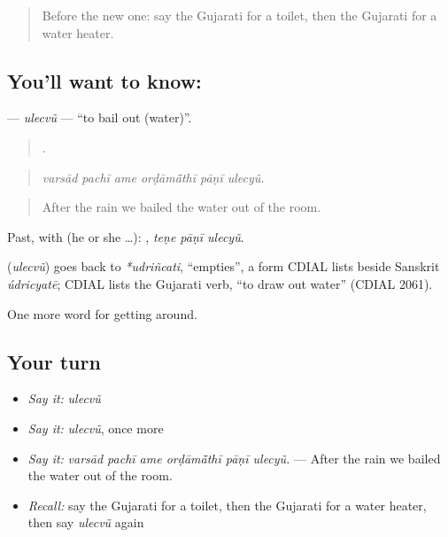 \begin{quote}
Before the new one: say the Gujarati for a toilet, then the Gujarati for a water heater.
\end{quote}

\subsection*{You'll want to know: }
\textbf{} — \emph{ulecvũ} — \textquotedblleft{}to bail out (water)\textquotedblright{}.

\begin{quote}
     .
\end{quote}

\begin{quote}
\emph{varsād pachī ame orḍāmā̃thī pāṇī ulecyũ.}
\end{quote}

\begin{quote}
After the rain we bailed the water out of the room.
\end{quote}

Past, with  (he or she …):   , \emph{teṇe pāṇī ulecyũ}.

\begin{cousinweb}
\textbf{} (\emph{ulecvũ}) goes back to \emph{*udriñcati}, \textquotedblleft{}empties\textquotedblright{}, a form CDIAL lists beside Sanskrit \emph{údricyatē}; CDIAL lists the Gujarati verb, \textquotedblleft{}to draw out water\textquotedblright{} (CDIAL 2061).
\end{cousinweb}

\begin{grammarlens}[title={What you've built}]
One more word for getting around.
\end{grammarlens}

\subsection*{Your turn}
\begin{itemize}
\raggedright
  \item \emph{Say it:} \emph{ulecvũ}
  \item \emph{Say it:} \emph{ulecvũ}, once more
  \item \emph{Say it:} \emph{varsād pachī ame orḍāmā̃thī pāṇī ulecyũ.} — After the rain we bailed the water out of the room.
  \item \emph{Recall:} say the Gujarati for a toilet, then the Gujarati for a water heater, then say \emph{ulecvũ} again
\end{itemize}

